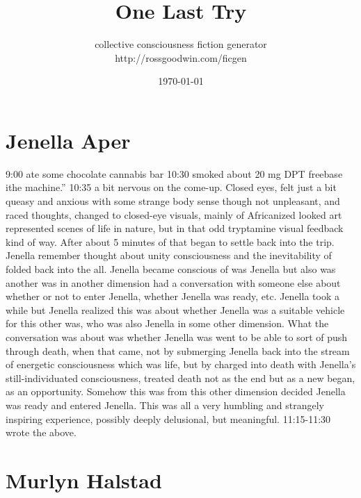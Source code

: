 \documentclass[12pt]{book}
\title{One Last Try}
\author{collective consciousness fiction generator\\http://rossgoodwin.com/ficgen}
\date{\today}
\begin{document}
\maketitle



\chapter{Jenella Aper}

9:00 ate some chocolate cannabis bar 10:30 smoked about 20 mg DPT freebase ithe machine.'' 10:35 a bit nervous on the come-up. Closed eyes, felt just a bit queasy and anxious with some strange body sense though not unpleasant, and raced thoughts, changed to closed-eye visuals, mainly of Africanized looked art represented scenes of life in nature, but in that odd tryptamine visual feedback kind of way. After about 5 minutes of that began to settle back into the trip. Jenella remember thought about unity consciousness and the inevitability of folded back into the all. Jenella became conscious of was Jenella but also was another was in another dimension had a conversation with someone else about whether or not to enter Jenella, whether Jenella was ready, etc. Jenella took a while but Jenella realized this was about whether Jenella was a suitable vehicle for this other was, who was also Jenella in some other dimension. What the conversation was about was whether Jenella was went to be able to sort of push through death, when that came, not by submerging Jenella back into the stream of energetic consciousness which was life, but by charged into death with Jenella's still-individuated consciousness, treated death not as the end but as a new began, as an opportunity. Somehow this was from this other dimension decided Jenella was ready and entered Jenella. This was all a very humbling and strangely inspiring experience, possibly deeply delusional, but meaningful. 11:15-11:30 wrote the above.






\chapter{Murlyn Halstad}
\end{document}
